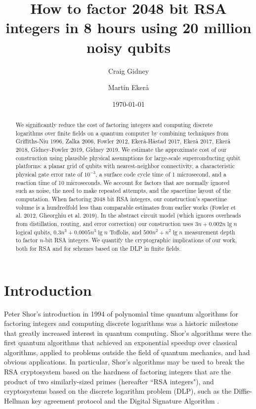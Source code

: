 \documentclass[superscriptaddress,notitlepage,longbibliography]{revtex4-1}
\theoremstyle{definition}
\theoremstyle{definition}
\begin{document}
\title{How to factor 2048 bit RSA integers in 8 hours using 20 million noisy qubits}

\date{\today}
\author{Craig Gidney}
\author{Martin Ekerå}

\begin{abstract}
We significantly reduce the cost of factoring integers and computing discrete logarithms over finite fields on a quantum computer by combining techniques from Griffiths-Niu 1996, Zalka 2006, Fowler 2012, Ekerå-Håstad 2017, Ekerå 2017, Ekerå 2018, Gidney-Fowler 2019, Gidney 2019.
We estimate the approximate cost of our construction using plausible physical assumptions for large-scale superconducting qubit platforms:
 a planar grid of qubits with nearest-neighbor connectivity,
 a characteristic physical gate error rate of $10^{-3}$,
 a surface code cycle time of 1 microsecond,
 and a reaction time of 10 micro\-seconds.
We account for factors that are normally ignored such as noise, the need to make repeated attempts, and the spacetime layout of the computation.
When factoring 2048 bit RSA integers, our construction's spacetime volume is a hundredfold less than comparable estimates from earlier works (Fowler et al. 2012, Gheorghiu et al. 2019).
In the abstract circuit model (which ignores overheads from distillation, routing, and error correction) our construction uses $3 n + 0.002 n \lg n$ logical qubits, $0.3 n^3 + 0.0005 n^3 \lg n$ Toffolis, and $500 n^2 + n^2 \lg n$ measurement depth to factor $n$-bit RSA integers.
We quantify the cryptographic implications of our work, both for RSA and for schemes based on the DLP in finite fields.
\end{abstract}

\maketitle

\section{Introduction}
\label{sec:introduction}
Peter Shor's introduction in 1994 of polynomial time quantum algorithms for factoring integers and computing discrete logarithms \cite{shor1994,Timeline} was a historic milestone that greatly increased interest in quantum computing.
Shor's algorithms were the first quantum algorithms that achieved an exponential speedup over classical algorithms, applied to problems outside the field of quantum mechanics, and had obvious applications.
In particular, Shor's algorithms may be used to break the RSA cryptosystem \cite{rsa} based on the hardness of factoring integers that are the product of two similarly-sized primes (hereafter ``RSA integers"), and cryptosystems based on the discrete logarithm problem (DLP), such as the Diffie-Hellman key agreement protocol \cite{diffie-hellman} and the Digital Signature Algorithm \cite{fips-186-4}.
\end{document}
